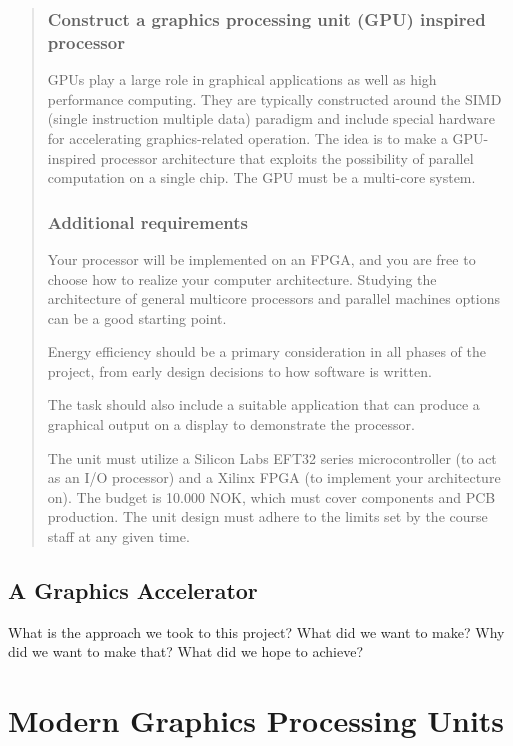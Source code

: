 \documentclass[../main/report.tex]{subfiles}
\begin{document}
\begin{quotation}
	\subsubsection{Construct a graphics processing unit (GPU) inspired processor}
    \noindent GPUs play a large role in graphical applications as well as high performance computing.
    They are typically constructed around the SIMD (single instruction multiple data) paradigm and
    include special hardware for accelerating graphics-related operation. The idea is to make a
    GPU-inspired processor architecture that exploits the possibility of parallel computation on a
    single chip. The GPU must be a multi-core system.
    
    \subsubsection{Additional requirements}
    \noindent Your processor will be implemented on an FPGA, and you are free to choose how to
    realize your computer architecture. Studying the architecture of general multicore processors
    and parallel machines options can be a good starting point.
    
    Energy efficiency should be a primary consideration in all phases of the project, from early
    design decisions to how software is written.
    
    The task should also include a suitable application that can produce a graphical output on a
    display to demonstrate the processor.
    
    The unit must utilize a Silicon Labs EFT32 series microcontroller (to act as an I/O processor)
    and a Xilinx FPGA (to implement your architecture on). The budget is 10.000 NOK, which must
    cover components and PCB production. The unit design must adhere to the limits set by the
    course staff at any given time.
\end{quotation}
\newpage

\subsection{A Graphics Accelerator}

What is the approach we took to this project?
What did we want to make?
Why did we want to make that?
What did we hope to achieve?

\section{Modern Graphics Processing Units}
\end{document}
